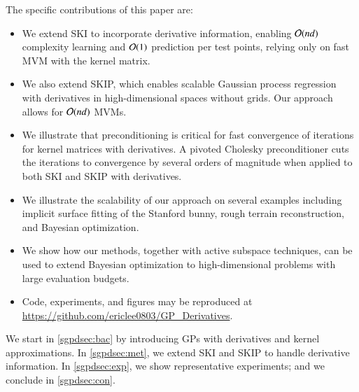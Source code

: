 The specific contributions of this paper are:
\begin{itemize}
  \item We extend SKI to incorporate derivative information, enabling $\mathcal{O}
  (nd)$ complexity learning and $\mathcal{O}(1)$ prediction per test points, relying
  only on fast MVM with the kernel matrix.

  \item We also extend SKIP, which enables scalable Gaussian process regression
  with derivatives in high-dimensional spaces without grids.  Our approach
  allows for $\mathcal{O}(nd)$ MVMs.

  \item We illustrate that preconditioning is critical for fast convergence of
  iterations for kernel matrices with derivatives.  A pivoted Cholesky
  preconditioner cuts the iterations to convergence by several orders of
  magnitude when applied to both SKI and SKIP with derivatives.

  \item We illustrate the scalability of our approach on several examples
  including implicit surface fitting of the Stanford bunny, rough terrain
  reconstruction, and Bayesian optimization.

  \item We show how our methods, together with active subspace techniques, can
  be used to extend Bayesian optimization to high-dimensional problems with
  large evaluation budgets.

  \item Code, experiments, and figures may be reproduced at 
  \url{https://github.com/ericlee0803/GP_Derivatives}.
\end{itemize}


We start in \cref{sgpdsec:bac} by introducing GPs with derivatives and kernel
approximations.  In \cref{sgpdsec:met}, we extend SKI and SKIP to handle
derivative information. In \cref{sgpdsec:exp}, we show representative
experiments; and we conclude in \cref{sgpdsec:con}.